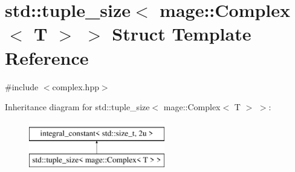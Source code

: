 \hypertarget{structstd_1_1tuple__size_3_01mage_1_1_complex_3_01_t_01_4_01_4}{}\section{std\+:\+:tuple\+\_\+size$<$ mage\+:\+:Complex$<$ T $>$ $>$ Struct Template Reference}
\label{structstd_1_1tuple__size_3_01mage_1_1_complex_3_01_t_01_4_01_4}


{\ttfamily \#include $<$complex.\+hpp$>$}

Inheritance diagram for std\+:\+:tuple\+\_\+size$<$ mage\+:\+:Complex$<$ T $>$ $>$\+:\begin{figure}[H]
\begin{center}
\leavevmode
\includegraphics[height=2.000000cm]{structstd_1_1tuple__size_3_01mage_1_1_complex_3_01_t_01_4_01_4}
\end{center}
\end{figure}
